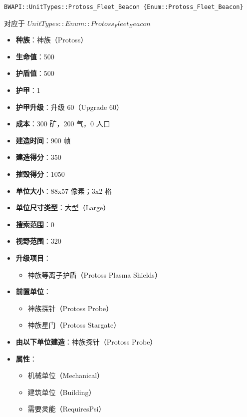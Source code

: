 \begin{tcolorbox}[colback=white, colframe=black!60!white, title=Protoss\_Fleet\_Beacon(), arc=0mm]
    \begin{verbatim}
BWAPI::UnitTypes::Protoss_Fleet_Beacon {Enum::Protoss_Fleet_Beacon}
    \end{verbatim}
    对应于  $ UnitTypes::Enum::Protoss_Fleet_Beacon $ 
    \begin{itemize}
        \item \textbf{种族}：神族（Protoss）
        \item \textbf{生命值}：500
        \item \textbf{护盾值}：500
        \item \textbf{护甲}：1
        \item \textbf{护甲升级}：升级 60（Upgrade 60）
        \item \textbf{成本}：300 矿，200 气，0 人口
        \item \textbf{建造时间}：900 帧
        \item \textbf{建造得分}：350
        \item \textbf{摧毁得分}：1050
        \item \textbf{单位大小}：88x57 像素；3x2 格
        \item \textbf{单位尺寸类型}：大型（Large）
        \item \textbf{搜索范围}：0
        \item \textbf{视野范围}：320
        \item \textbf{升级项目}：
            \begin{itemize}
                \item 神族等离子护盾（Protoss Plasma Shields）
            \end{itemize}
        \item \textbf{前置单位}：
            \begin{itemize}
                \item 神族探针（Protoss Probe）
                \item 神族星门（Protoss Stargate）
            \end{itemize}
        \item \textbf{由以下单位建造}：神族探针（Protoss Probe）
        \item \textbf{属性}：
            \begin{itemize}
                \item 机械单位（Mechanical）
                \item 建筑单位（Building）
                \item 需要灵能（RequiresPsi）
            \end{itemize}
    \end{itemize}
\end{tcolorbox}

